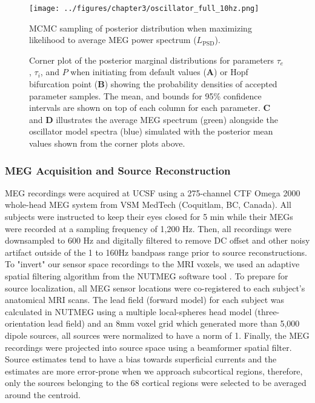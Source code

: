 \begin{figure}[ht]
    \centering
    \texttt{[image: ../figures/chapter3/oscillator\_full\_10hz.png]}
    \caption{MCMC sampling of posterior distribution when maximizing likelihood to average MEG power spectrum ($L_{\textrm{PSD}}$).}
    \caption*{Corner plot of the posterior marginal distributions for parameters $\tau_e$, $\tau_i$, and $P$ when initiating from default values (\textbf{A}) or Hopf bifurcation point (\textbf{B}) showing the probability densities of accepted parameter samples. The mean, and bounds for 95\% confidence intervals are shown on top of each column for each parameter. \textbf{C} and \textbf{D} illustrates the average MEG spectrum (green) alongside the oscillator model spectra (blue) simulated with the posterior mean values shown from the corner plots above.}
    \label{fig:oscillator_full}
\end{figure}

\subsubsection{MEG Acquisition and Source Reconstruction}
MEG recordings were acquired at UCSF using a 275-channel CTF Omega 2000 whole-head MEG system from VSM MedTech (Coquitlam, BC, Canada). All subjects were instructed to keep their eyes closed for 5 min while their MEGs were recorded at a sampling frequency of 1,200 Hz. Then, all recordings were downsampled to 600 Hz and digitally filtered to remove DC offset and other noisy artifact outside of the 1 to 160Hz bandpass range prior to source reconstructions. To "invert" our sensor space recordings to the MRI voxels, we used an adaptive spatial filtering algorithm from the NUTMEG software tool \cite{dalal_nutmeg:_2004}. To prepare for source localization, all MEG sensor locations were co-registered to each subject's anatomical MRI scans. The lead field (forward model) for each subject was calculated in NUTMEG using a multiple local-spheres head model (three-orientation lead field) and an 8mm voxel grid which generated more than 5,000 dipole sources, all sources were normalized to have a norm of 1. Finally, the MEG recordings were projected into source space using a beamformer spatial filter. Source estimates tend to have a bias towards superficial currents and the estimates are more error-prone when we approach subcortical regions, therefore, only the sources belonging to the 68 cortical regions were selected to be averaged around the centroid.

